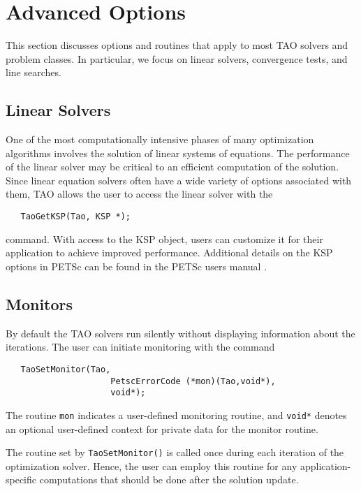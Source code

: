 
\chapter{Advanced Options}

This section discusses options and routines that apply to most TAO
solvers and problem classes.  In particular, we focus on
linear solvers, convergence tests, and line searches.

\section{Linear Solvers}\label{sec:TaoLinearSolvers}
One of the most computationally intensive phases of many optimization
algorithms involves the solution of linear systems of equations.  
The performance of the linear solver may be critical to an efficient 
computation of the solution.  Since linear equation solvers often have 
a wide variety of options associated with them, TAO allows the user to 
access the linear solver with the
\begin{verbatim}
   TaoGetKSP(Tao, KSP *);
\end{verbatim}
command. 
With access to the KSP object, users can customize it for their application
to achieve improved performance. Additional details on the KSP options in
PETSc can be found in the PETSc users manual \cite{petsc-user-ref}.



\section{Monitors}
By default the TAO solvers run silently without displaying information
about the iterations. The user can initiate monitoring with the
command  
\begin{verbatim}
   TaoSetMonitor(Tao,
                     PetscErrorCode (*mon)(Tao,void*),
                     void*);
\end{verbatim}
\noindent
The routine {\tt mon} indicates a user-defined monitoring routine,
and {\tt void*} denotes an optional user-defined context for private 
data for the monitor routine.

The routine set by {\tt TaoSetMonitor()} is called once during each
iteration of the optimization solver.  Hence, the user can employ this 
routine for any application-specific computations that should be done 
after the solution update. 





